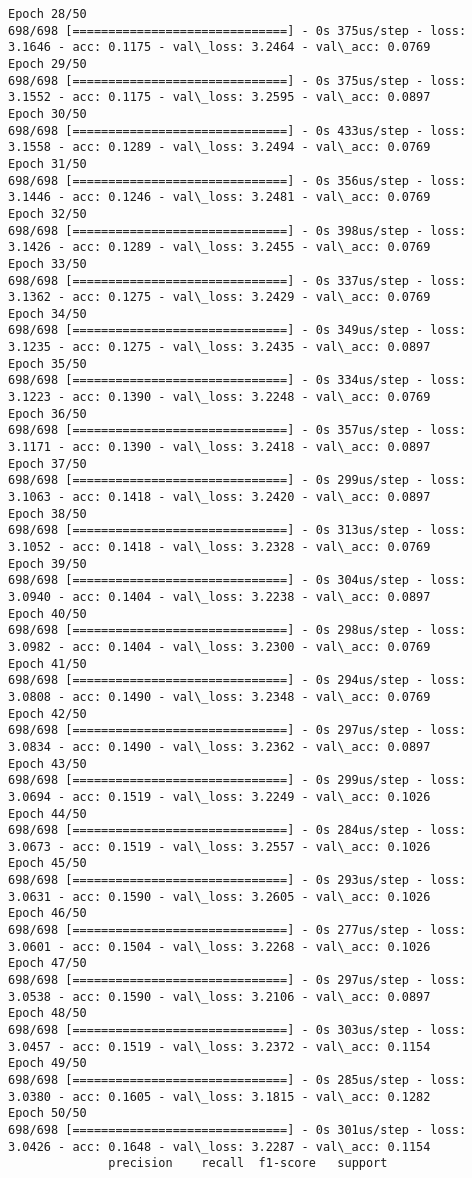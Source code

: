 \documentclass[11pt]{article}
\begin{document}
\begin{Verbatim}[commandchars=\\\{\}]
Epoch 28/50
698/698 [==============================] - 0s 375us/step - loss: 3.1646 - acc: 0.1175 - val\_loss: 3.2464 - val\_acc: 0.0769
Epoch 29/50
698/698 [==============================] - 0s 375us/step - loss: 3.1552 - acc: 0.1175 - val\_loss: 3.2595 - val\_acc: 0.0897
Epoch 30/50
698/698 [==============================] - 0s 433us/step - loss: 3.1558 - acc: 0.1289 - val\_loss: 3.2494 - val\_acc: 0.0769
Epoch 31/50
698/698 [==============================] - 0s 356us/step - loss: 3.1446 - acc: 0.1246 - val\_loss: 3.2481 - val\_acc: 0.0769
Epoch 32/50
698/698 [==============================] - 0s 398us/step - loss: 3.1426 - acc: 0.1289 - val\_loss: 3.2455 - val\_acc: 0.0769
Epoch 33/50
698/698 [==============================] - 0s 337us/step - loss: 3.1362 - acc: 0.1275 - val\_loss: 3.2429 - val\_acc: 0.0769
Epoch 34/50
698/698 [==============================] - 0s 349us/step - loss: 3.1235 - acc: 0.1275 - val\_loss: 3.2435 - val\_acc: 0.0897
Epoch 35/50
698/698 [==============================] - 0s 334us/step - loss: 3.1223 - acc: 0.1390 - val\_loss: 3.2248 - val\_acc: 0.0769
Epoch 36/50
698/698 [==============================] - 0s 357us/step - loss: 3.1171 - acc: 0.1390 - val\_loss: 3.2418 - val\_acc: 0.0897
Epoch 37/50
698/698 [==============================] - 0s 299us/step - loss: 3.1063 - acc: 0.1418 - val\_loss: 3.2420 - val\_acc: 0.0897
Epoch 38/50
698/698 [==============================] - 0s 313us/step - loss: 3.1052 - acc: 0.1418 - val\_loss: 3.2328 - val\_acc: 0.0769
Epoch 39/50
698/698 [==============================] - 0s 304us/step - loss: 3.0940 - acc: 0.1404 - val\_loss: 3.2238 - val\_acc: 0.0897
Epoch 40/50
698/698 [==============================] - 0s 298us/step - loss: 3.0982 - acc: 0.1404 - val\_loss: 3.2300 - val\_acc: 0.0769
Epoch 41/50
698/698 [==============================] - 0s 294us/step - loss: 3.0808 - acc: 0.1490 - val\_loss: 3.2348 - val\_acc: 0.0769
Epoch 42/50
698/698 [==============================] - 0s 297us/step - loss: 3.0834 - acc: 0.1490 - val\_loss: 3.2362 - val\_acc: 0.0897
Epoch 43/50
698/698 [==============================] - 0s 299us/step - loss: 3.0694 - acc: 0.1519 - val\_loss: 3.2249 - val\_acc: 0.1026
Epoch 44/50
698/698 [==============================] - 0s 284us/step - loss: 3.0673 - acc: 0.1519 - val\_loss: 3.2557 - val\_acc: 0.1026
Epoch 45/50
698/698 [==============================] - 0s 293us/step - loss: 3.0631 - acc: 0.1590 - val\_loss: 3.2605 - val\_acc: 0.1026
Epoch 46/50
698/698 [==============================] - 0s 277us/step - loss: 3.0601 - acc: 0.1504 - val\_loss: 3.2268 - val\_acc: 0.1026
Epoch 47/50
698/698 [==============================] - 0s 297us/step - loss: 3.0538 - acc: 0.1590 - val\_loss: 3.2106 - val\_acc: 0.0897
Epoch 48/50
698/698 [==============================] - 0s 303us/step - loss: 3.0457 - acc: 0.1519 - val\_loss: 3.2372 - val\_acc: 0.1154
Epoch 49/50
698/698 [==============================] - 0s 285us/step - loss: 3.0380 - acc: 0.1605 - val\_loss: 3.1815 - val\_acc: 0.1282
Epoch 50/50
698/698 [==============================] - 0s 301us/step - loss: 3.0426 - acc: 0.1648 - val\_loss: 3.2287 - val\_acc: 0.1154
              precision    recall  f1-score   support


\end{Verbatim}
\end{document}
